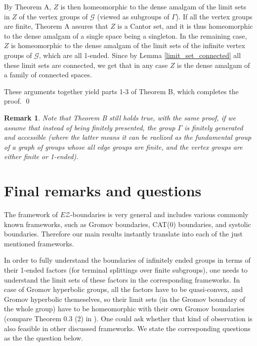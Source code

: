 \documentclass[12pt, a4paper]{article}
\newcommand{\8}{\infty}
\theoremstyle{break}
\newtheorem{rk}[thm]{Remark}
\theoremstyle{defbreak}
\begin{document}
By Theorem A, $Z$ is then homeomorphic to
the dense amalgam of the limit sets in $Z$ of the vertex groups
of $\mathcal{G}$ (viewed as subgroups of $\Gamma$). If all the vertex 
groups are finite, Theorem A assures that $Z$ is a Cantor set,
and it is thus homeomorphic to the dense amalgam of a single space
being a singleton. In the remaining case, $Z$ is homeomorphic
to the dense amalgam of the limit sets of the infinite vertex groups 
of $\mathcal{G}$, which are all 1-ended. Since by 
Lemma \ref{limit_set_connected} 
all these limit sets are connected, we get that in any case $Z$
is the dense amalgam of a family of connected spaces. 

These arguments together yield parts 1-3 of Theorem B,
which completes the proof.  \qed

\medskip
\begin{rk}
Note that Theorem B still holds true, with the same proof, if we assume that
instead of being finitely presented, the group $\Gamma$ is finitely generated and accessible (where the latter means it can be raelized as the fundamental group
of a graph of groups whose all edge groups are finite, and the vertex groups are
either finite or 1-ended).
\end{rk}










\section{Final remarks and questions}\label{Section:final_conclusions}

The framework of $E\mathcal{Z}$-boundaries is very general and includes various commonly known frameworks, 
such as Gromov boundaries, CAT(0) boundaries, and systolic boundaries. 
Therefore our main results instantly translate into each of the just mentioned frameworks.

In order to fully understand the boundaries of infinitely ended groups in terms of their 1-ended factors
(for terminal splittings over finite subgroups), one needs to understand the limit sets of these factors
in the corresponding frameworks. In case of Gromov hyperbolic groups, all the factors have to be quasi-convex,
and Gromov
hyperbolic themeselves, so their limit sets (in the Gromov boundary of the whole group)
have to be homeomorphic with their own Gromov boundaries (compare Theorem 0.3 (2) in \cite{dense-amalgam}).
One could ask whether that kind of observation is also feasible in other discussed frameworks. 
We state the corresponding questions as the the question below.\medskip
\end{document}
